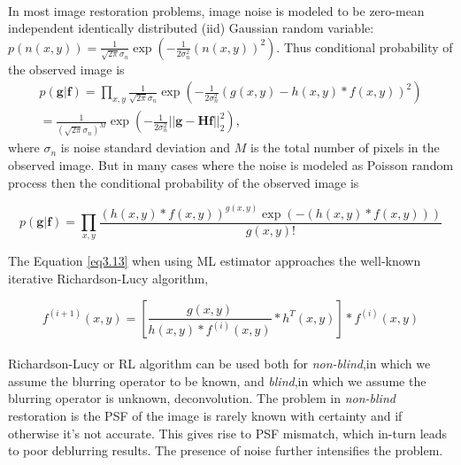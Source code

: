 \documentclass[a4paper]{book}
\begin{document}
\paragraph*{} In most image restoration problems, image noise is modeled to be zero-mean independent identically distributed (iid) Gaussian random variable: $ p(n(x,y)) = \frac{1}{\sqrt{2\pi}\sigma_{n}}\exp\left(-\frac{1}{2\sigma_{n}^{2}}(n(x,y))^{2}\right)$. Thus conditional probability of the observed image is 
\begin{equation}
\begin{multlined}
	\label{eq3.12}
	p(\textbf{g}|\textbf{f}) = \prod_{x,y}\frac{1}{\sqrt{2\pi}\sigma_{n}}\exp\left(-\frac{1}{2\sigma_{n}^{2}}(g(x,y)-h(x,y)*f(x,y))^{2}\right) \\
	= \frac{1}{\left(\sqrt{2\pi}\sigma_{n}\right)^{M}}
		\exp\left(-\frac{1}{2\sigma_{n}^{2}} ||\textbf{g} - \textbf{Hf}||^{2}_{2} \right),
\end{multlined}
\end{equation}
where $ \sigma_{n} $ is noise standard deviation and $ M $ is the total number of pixels in the observed image.
But in many cases where the noise is modeled as Poisson random process then the conditional probability of the observed image is 

\begin{equation}
	\label{eq3.13}
	p(\textbf{g}|\textbf{f}) = \prod_{x,y}\frac{\left(h(x,y)*f(x,y)\right)^{g(x,y)}\exp \left(-(h(x,y)*f(x,y))\right)}{g(x,y)!}
\end{equation}

%
The Equation \ref{eq3.13} when using ML estimator approaches the well-known iterative Richardson-Lucy algorithm\cite{Richardson72RL}\cite{Lucy74RL},

\begin{equation}
	\label{eq3.14}
	f^{(i+1)}(x,y) = \left[\frac{g(x,y)}{h(x,y)*f^{(i)}(x,y)}*h^T(x,y)\right]*f^{(i)}(x,y)
\end{equation}
\paragraph*{} Richardson-Lucy or RL algorithm can be used both for \textit{non-blind},in which we assume the blurring operator to be known, and \textit{blind},in which we assume the blurring operator is unknown, deconvolution. The problem in \textit{non-blind} restoration is the PSF of the image is rarely known with certainty and if otherwise it's not accurate. This gives rise to PSF mismatch, which in-turn leads to poor deblurring results. The presence of noise further intensifies the problem.\cite{almeida2010blind}
\end{document}
